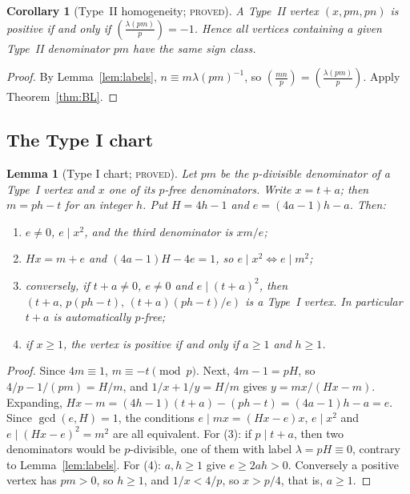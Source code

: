 \documentclass[11pt,reqno]{amsart}
\newtheorem{lemma}[theorem]{Lemma}
\newtheorem{corollary}[theorem]{Corollary}
\theoremstyle{definition}
\newcommand{\leg}[2]{\left(\frac{#1}{#2}\right)}
\newcommand{\status}[1]{\textsc{#1}}
\begin{document}
\begin{corollary}[Type~II homogeneity; \status{proved}]\label{cor:typeII}
A Type~II vertex $(x,pm,pn)$ is positive if and only if
$\leg{\lambda(pm)}{p}=-1$.  Hence all vertices containing a given Type~II
denominator $pm$ have the same sign class.
\end{corollary}

\begin{proof}
By Lemma~\ref{lem:labels}, $n\equiv m\lambda(pm)^{-1}$, so
$\leg{mn}{p}=\leg{\lambda(pm)}{p}$.  Apply Theorem~\ref{thm:BL}.
\end{proof}

\subsection{The Type I chart}

\begin{lemma}[Type I chart; \status{proved}]\label{lem:chart}
Let $pm$ be the $p$-divisible denominator of a Type~I vertex and $x$ one of
its $p$-free denominators.  Write $x=t+a$; then $m=ph-t$ for an integer $h$.
Put $H=4h-1$ and $e=(4a-1)h-a$.  Then:
\begin{enumerate}
\item $e\ne0$, $e\mid x^2$, and the third denominator is $xm/e$;
\item $Hx=m+e$ and $(4a-1)H-4e=1$, so $e\mid x^2\iff e\mid m^2$;
\item conversely, if $t+a\ne0$, $e\ne0$ and $e\mid(t+a)^2$, then
$(t+a,\,p(ph-t),\,(t+a)(ph-t)/e)$ is a Type~I vertex.  In particular $t+a$
is automatically $p$-free;
\item if $x\ge1$, the vertex is positive if and only if $a\ge1$ and $h\ge1$.
\end{enumerate}
\end{lemma}

\begin{proof}
Since $4m\equiv1$, $m\equiv-t\pmod p$.  Next, $4m-1=pH$, so
$4/p-1/(pm)=H/m$, and $1/x+1/y=H/m$ gives $y=mx/(Hx-m)$.  Expanding,
$Hx-m=(4h-1)(t+a)-(ph-t)=(4a-1)h-a=e$.  Since $\gcd(e,H)=1$, the
conditions $e\mid mx=(Hx-e)x$, $e\mid x^2$ and $e\mid(Hx-e)^2=m^2$ are all
equivalent.  For (3): if $p\mid t+a$, then two denominators would be
$p$-divisible, one of them with label $\lambda=pH\equiv0$, contrary to
Lemma~\ref{lem:labels}.  For (4): $a,h\ge1$ give $e\ge2ah>0$.  Conversely
a positive vertex has $pm>0$, so $h\ge1$, and $1/x<4/p$, so $x>p/4$, that
is, $a\ge1$.
\end{proof}
\end{document}
